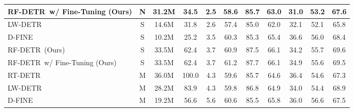 \documentclass{article} %
\newcommand{\method}{RF-DETR}
\begin{document}
{\begin{table}[t]
{\begin{tabular}{|lcccccccccc|}
\multicolumn{1}{|l|}{\method \ w/ Fine-Tuning (Ours)}     & \multicolumn{1}{c|}{N}     &   31.2M   &   34.5     & \multicolumn{1}{c|}{2.5}             &  58.6  &  85.7   &   63.0  &  31.0  &  53.2   &  67.6  \\ \hline \hline
\multicolumn{1}{|l|}{LW-DETR \citep{chen2024lw} }      & \multicolumn{1}{c|}{S}     &   14.6M   &    31.8     & \multicolumn{1}{c|}{2.6}             &  57.4  &   85.0   &   62.0   &  32.1   &  52.1   &  65.8   \\ \hline
\multicolumn{1}{|l|}{D-FINE \citep{peng2024dfine}}      & \multicolumn{1}{c|}{S}  &  10.2M    &   25.2         & \multicolumn{1}{c|}{3.5}             &  60.3  &  85.3    &   65.4   &  36.6   &  56.0   &  68.4   \\ \hline
\multicolumn{1}{|l|}{\method \ (Ours)}     & \multicolumn{1}{c|}{S}     &    33.5M   &    62.4    & \multicolumn{1}{c|}{3.7}             & 60.9   &   87.5   &   66.1   &  34.2   &   55.7  &  69.6   \\ \hline
\multicolumn{1}{|l|}{\method \ w/ Fine-Tuning (Ours)}     & \multicolumn{1}{c|}{S}     &    33.5M   &    62.4    & \multicolumn{1}{c|}{3.7}             &  61.2  &  87.7    &  66.1   &  34.9  &  55.6  & 69.5   \\ \hline \hline
\multicolumn{1}{|l|}{RT-DETR \citep{zhao2024rtdetr}}      & \multicolumn{1}{c|}{M}     &   36.0M    &    100.0    & \multicolumn{1}{c|}{4.3}             & 59.6   &   85.7   &   64.6   &  36.4   &  54.6   &  67.3   \\ \hline
\multicolumn{1}{|l|}{LW-DETR \citep{chen2024lw}}      & \multicolumn{1}{c|}{M}     &   28.2M    &   83.9     & \multicolumn{1}{c|}{4.3}             & 59.8   &   86.8   &   64.9   &  34.0   &  54.4   &   68.9  \\ \hline
\multicolumn{1}{|l|}{D-FINE \citep{peng2024dfine}}      & \multicolumn{1}{c|}{M}     &   19.2M    &    56.6    & \multicolumn{1}{c|}{5.6}             &   60.6 &   85.5   &   65.8   &  36.0   &  56.6   &  67.5   \\ \hline

\end{tabular}}
\end{table}}
\end{document}
